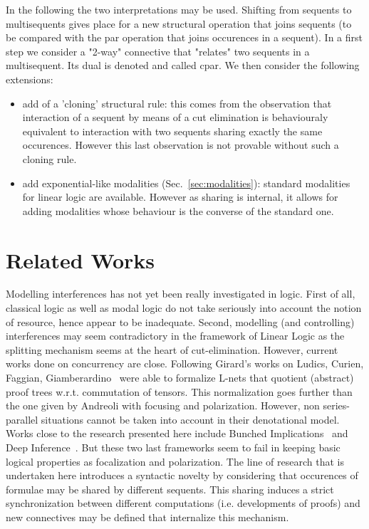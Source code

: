 \documentclass{llncs}
\begin{document}
In the following the two interpretations may be used. 
Shifting from sequents to multisequents gives place for a new structural operation that joins sequents (to be compared with the par operation that joins occurences in a sequent). In a first step we consider a "2-way" connective that "relates" two sequents in a multisequent. Its dual is denoted  and called cpar.
We then consider the following extensions:
\begin{itemize}
\item add of a 'cloning' structural rule: this comes from the observation that interaction of a sequent by means of a cut elimination is behaviouraly equivalent to interaction with two sequents sharing exactly the same occurences. However this last observation is not provable without such a cloning rule.
\item add exponential-like modalities (Sec.~\ref{sec:modalities}): standard modalities for linear logic are available. However as sharing is internal, it allows for adding modalities whose behaviour is the converse of the standard one.
\end{itemize}



 
\section{Related Works}\label{sec:RelatedWorks}




Modelling interferences has not yet been really investigated in logic. First of all, classical logic as well as modal logic do not take seriously into account the notion of resource, hence appear to be inadequate. Second, modelling (and controlling) interferences may seem contradictory in the framework of Linear Logic as the splitting mechanism seems at the heart of cut-elimination. However, current works done on concurrency are close.
Following Girard's works on Ludics, Curien, Faggian, Giamberardino~\cite{DBLP:conf/csl/CurienF05,DBLP:conf/csl/GiamberardinoF06} were able to formalize L-nets that quotient (abstract) proof trees w.r.t. commutation of tensors. This normalization goes further than the one given by Andreoli with focusing and polarization.
However, non series-parallel situations cannot be taken into account in their denotational model.
Works close to the research presented here include Bunched Implications~\cite{DBLP:journals/bsl/OHearnP99} and Deep Inference~\cite{DBLP:journals/tocl/Guglielmi07}.
But these two last frameworks seem to fail in keeping basic logical properties as focalization and polarization.
The line of research that is undertaken here introduces a syntactic novelty by considering that occurences of formulae may be shared by different sequents. This sharing induces a strict synchronization between different computations (i.e. developments of proofs) and new connectives may be defined that internalize this mechanism.
\end{document}
